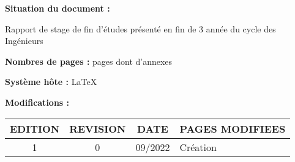 \textbf{Situation du document :} 
\vspace{0.2cm}
\par
Rapport de stage de fin d'études présenté en fin de 3 année du cycle des Ingénieurs
\vspace{0.3cm}



\textbf{Nombres de pages :}  pages dont  d'annexes
\vspace{0.3cm}

\textbf{Système hôte :} \LaTeX
\vspace{1cm}


\textbf{Modifications :} 
\begin{center}
\begin{tabular}{|c|c|c|>{\centering}p{6.5cm}|}
\hline 
EDITION & REVISION & DATE & PAGES MODIFIEES\tabularnewline
\hline
\hline 
1 & 0 & 09/2022 & Création\tabularnewline
\hline 

\end{tabular}
\end{center}